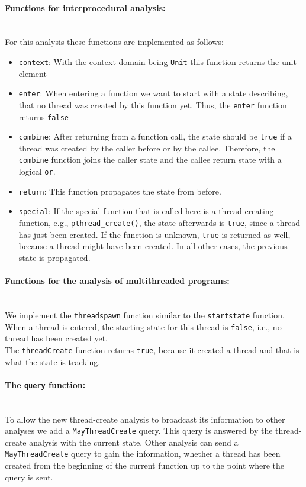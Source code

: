     \paragraph{Functions for interprocedural analysis:}\mbox{}\\
    For this analysis these functions are implemented as follows:
    \begin{itemize}
      \item \texttt{context}: With the context domain being \texttt{Unit} this function returns the unit element
      \item \texttt{enter}: When entering a function we want to start with a state describing, that no thread was created by this function yet. Thus, the \texttt{enter} function returns \texttt{false}
      \item \texttt{combine}: After returning from a function call, the state should be \texttt{true} if a thread was created by the caller before or by the callee. Therefore, the \texttt{combine} function joins the caller state and the callee return state with a logical \texttt{or}. 
      \item \texttt{return}: This function propagates the state from before.
      \item \texttt{special}: If the special function that is called here is a thread creating function, e.g., \texttt{pthread\_create()}, the state afterwards is \texttt{true}, since a thread has just been created. If the function is unknown, \texttt{true} is returned as well, because a thread might have been created. In all other cases, the previous state is propagated. 
    \end{itemize}

    \paragraph{Functions for the analysis of multithreaded programs:}\mbox{}\\
    We implement the \texttt{threadspawn} function similar to the \texttt{startstate} function. When a thread is entered, the starting state for this thread is \texttt{false}, i.e., no thread has been created yet.\\
    The \texttt{threadCreate} function returns \texttt{true}, because it created a thread and that is what the state is tracking.

    \paragraph{The \texttt{query} function:}\mbox{}\\
    To allow the new thread-create analysis to broadcast its information to other analyses we add a \texttt{MayThreadCreate} query. This query is answered by the thread-create analysis with the current state. Other analysis can send a \texttt{MayThreadCreate} query to gain the information, whether a thread has been created from the beginning of the current function up to the point where the query is sent.


